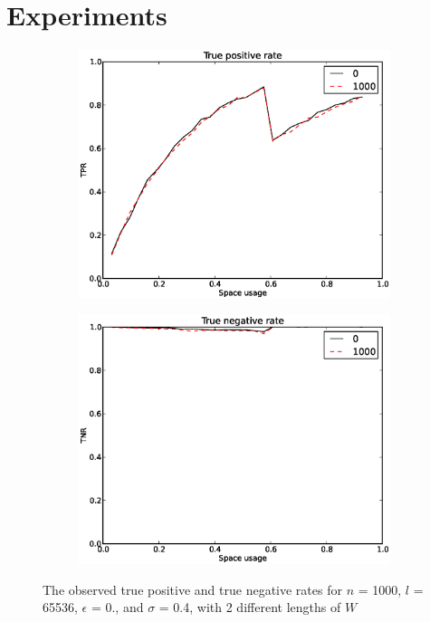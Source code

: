 \documentclass[a4paper,11pt]{article}
\begin{document}
\section{Experiments}\label{appendix:experiments}
\begin{figure}[H]
\centering
\begin{subfigure}{.5\textwidth}
  \centering
  \includegraphics[width=.95\linewidth]{wildcard_1000_TPR1}
\end{subfigure}%
\begin{subfigure}{.5\textwidth}
  \centering
  \includegraphics[width=.95\linewidth]{wildcard_1000_TNR1}
\end{subfigure}
\caption{The observed true positive and true negative rates for $n$ = 1000, $l$ = 65536, $\epsilon$ = 0., and $\sigma$ = 0.4, with 2 different lengths of $W$}
\label{fig:w-tpnr}
\end{figure}
%
\end{document}
